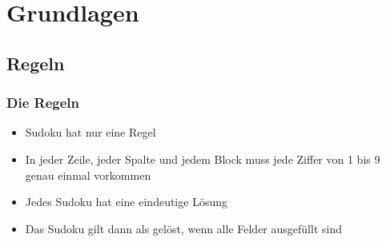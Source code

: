 \documentclass[accentcolor=tud6b,colorbacktitle,inverttitle,landscape,german,presentation,t]{tudbeamer}
\begin{document}
\section{Grundlagen}
	\subsection{Regeln}
		\begin{frame}
		\frametitle{Die Regeln}
		\begin{itemize}
		\item Sudoku hat nur eine Regel
		\item In jeder Zeile, jeder Spalte und jedem Block muss jede Ziffer von 1 bis 9 genau einmal vorkommen
		\item Jedes Sudoku hat eine eindeutige Lösung
		\item Das Sudoku gilt dann als gelöst, wenn alle Felder ausgefüllt sind
		\end{itemize}
		\end{frame}
\end{document}
